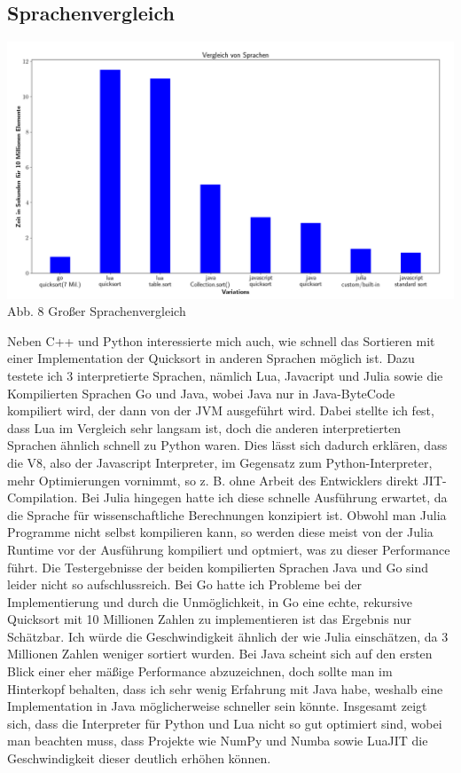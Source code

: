 \documentclass[10pt,a4paper]{article}
\begin{document}
\subsection{Sprachenvergleich}

\begin{center}
    \hspace*{-1.5cm}\includegraphics[width=1.2\textwidth]{./diagramme/matplotlib/comparison.png}
    Abb. 8 Großer Sprachenvergleich
\end{center}

\clearpage

Neben C++ und Python interessierte mich auch, wie schnell das Sortieren mit einer Implementation der Quicksort 
in anderen Sprachen möglich ist. Dazu testete ich 3 interpretierte Sprachen, nämlich Lua, Javacript und Julia sowie die
Kompilierten Sprachen Go und Java, wobei Java nur in Java-ByteCode kompiliert wird, der dann von der JVM ausgeführt wird.
Dabei stellte ich fest, dass Lua im Vergleich sehr langsam ist, doch die anderen interpretierten Sprachen ähnlich schnell zu Python waren.
Dies lässt sich dadurch erklären, dass die V8, also der Javascript Interpreter, im Gegensatz zum Python-Interpreter,
mehr Optimierungen vornimmt, so z. B. ohne Arbeit des Entwicklers direkt JIT-Compilation. Bei Julia hingegen hatte ich diese
schnelle Ausführung erwartet, da die Sprache für wissenschaftliche Berechnungen konzipiert ist. Obwohl man Julia Programme nicht selbst kompilieren kann,
so werden diese meist von der Julia Runtime vor der Ausführung kompiliert und optmiert, was zu dieser Performance führt.
Die Testergebnisse der beiden kompilierten Sprachen Java und Go sind leider nicht so aufschlussreich.
Bei Go hatte ich Probleme bei der Implementierung und durch die Unmöglichkeit, in Go eine echte, rekursive Quicksort mit 10 Millionen Zahlen
zu implementieren ist das Ergebnis nur Schätzbar. Ich würde die Geschwindigkeit ähnlich der wie Julia einschätzen, da 3 Millionen Zahlen weniger sortiert wurden.
Bei Java scheint sich auf den ersten Blick einer eher mäßige Performance abzuzeichnen, doch sollte man im Hinterkopf behalten,
dass ich sehr wenig Erfahrung mit Java habe, weshalb eine Implementation in Java möglicherweise schneller sein könnte.
Insgesamt zeigt sich, dass die Interpreter für Python und Lua nicht so gut optimiert sind, wobei man beachten muss, dass Projekte wie NumPy und Numba sowie LuaJIT
die Geschwindigkeit dieser deutlich erhöhen können.
\end{document}
